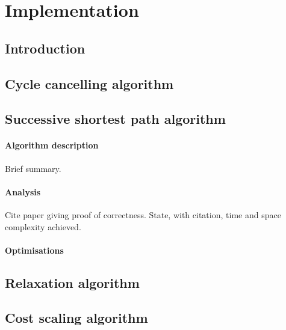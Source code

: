 \chapter{Implementation} \label{chap:impl}

\section{Introduction}


\section{Cycle cancelling algorithm}

\section{Successive shortest path algorithm}

\subsubsection{Algorithm description}

Brief summary.

\subsubsection{Analysis}

Cite paper giving proof of correctness. State, with citation, time and space complexity achieved.

\subsubsection{Optimisations}

\section{Relaxation algorithm}

\section{Cost scaling algorithm}

